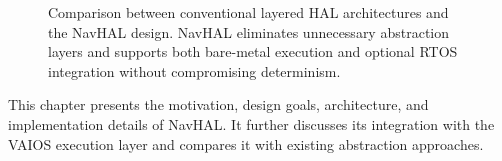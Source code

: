 \begin{figure}[H]
    \caption{Comparison between conventional layered HAL architectures and the NavHAL design. NavHAL eliminates unnecessary abstraction layers and supports both bare-metal execution and optional RTOS integration without compromising determinism.}
    \label{fig:navhal_architecture_comparison}
\end{figure}

This chapter presents the motivation, design goals, architecture, and implementation details of NavHAL. It further discusses its integration with the VAIOS execution layer and compares it with existing abstraction approaches.













